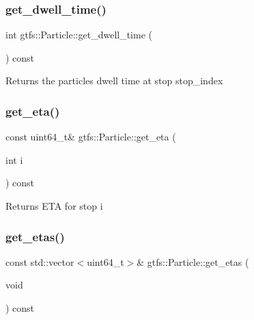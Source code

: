 \subsubsection{\texorpdfstring{get\+\_\+dwell\+\_\+time()}{get\_dwell\_time()}}
{\footnotesize\ttfamily int gtfs\+::\+Particle\+::get\+\_\+dwell\+\_\+time (\begin{DoxyParamCaption}{ }\end{DoxyParamCaption}) const\hspace{0.3cm}{\ttfamily [inline]}}

\begin{DoxyReturn}{Returns}
the particle\textquotesingle{}s dwell time at stop {\ttfamily stop\+\_\+index} 
\end{DoxyReturn}
\mbox{\label{classgtfs_1_1Particle_aded5954299e6184a664973036f8ba804}} 
\subsubsection{\texorpdfstring{get\+\_\+eta()}{get\_eta()}}
{\footnotesize\ttfamily const uint64\+\_\+t\& gtfs\+::\+Particle\+::get\+\_\+eta (\begin{DoxyParamCaption}\item[{int}]{i }\end{DoxyParamCaption}) const\hspace{0.3cm}{\ttfamily [inline]}}

\begin{DoxyReturn}{Returns}
E\+TA for stop {\ttfamily i} 
\end{DoxyReturn}
\mbox{\label{classgtfs_1_1Particle_ad1271a051a4040edc4ec47a188d75ad0}} 
\subsubsection{\texorpdfstring{get\+\_\+etas()}{get\_etas()}}
{\footnotesize\ttfamily const std\+::vector$<$uint64\+\_\+t$>$\& gtfs\+::\+Particle\+::get\+\_\+etas (\begin{DoxyParamCaption}\item[{void}]{ }\end{DoxyParamCaption}) const\hspace{0.3cm}{\ttfamily [inline]}}

